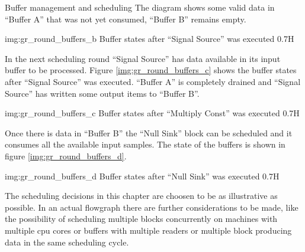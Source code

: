 \begin{subchapter}{Buffer management and scheduling}
  The diagram shows some valid data in ``Buffer A'' that was
  not yet consumed, ``Buffer B'' remains empty.

               {img:gr_round_buffers_b}
               {Buffer states after ``Signal Source'' was executed}
               {0.7}{H}

  In the next scheduling round ``Signal Source'' has data
  available in its input buffer to be processed.
  Figure \ref{img:gr_round_buffers_c} shows the buffer states
  after ``Signal Source'' was executed.
  ``Buffer A'' is completely drained and ``Signal Source'' has
  written some output items to ``Buffer B''.

               {img:gr_round_buffers_c}
               {Buffer states after ``Multiply Const'' was executed}
               {0.7}{H}

  Once there is data in ``Buffer B'' the ``Null Sink'' block
  can be scheduled and it consumes all the available input samples.
  The state of the buffers is shown in figure \ref{img:gr_round_buffers_d}.

               {img:gr_round_buffers_d}
               {Buffer states after ``Null Sink'' was executed}
               {0.7}{H}

  The scheduling decisions in this chapter are choosen to be
  as illustrative as possible. In an actual flowgraph there are
  further considerations to be made, like the possibility of scheduling
  multiple blocks concurrently on machines with multiple \gls{cpu} cores or
  buffers with multiple readers or multiple block producing data
  in the same scheduling cycle.
\end{subchapter}

